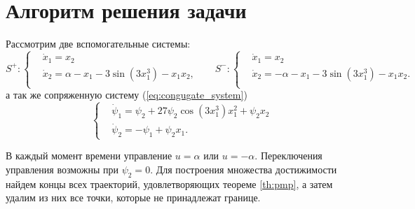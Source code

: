 \section{Алгоритм решения задачи}

Рассмотрим две вспомогательные системы:
$$
S^+ :
\left\{
\begin{aligned}
        & \dot x_1 = x_2 \\
        & \dot x_2 = \alpha - x_1 - 3 \sin(3x_1^3) - x_1 x_2, \\
\end{aligned}
\right.
\;\;\;\;\;\;
S^- :
\left\{
\begin{aligned}
        & \dot x_1 = x_2 \\
        & \dot x_2 = - \alpha - x_1 - 3 \sin(3x_1^3) - x_1 x_2. \\
\end{aligned}
\right.
$$
а так же сопряженную систему (\ref{eq:congugate_system})
$$
        \left\{
        \begin{aligned}
                & \dot\psi_1 = \psi_2 + 27\psi_2\cos(3x_1^3)x_1^2 + \psi_2 x_2 \\
                & \dot \psi_2 = -\psi_1 + \psi_2 x_1.
        \end{aligned}
        \right.
$$

В каждый момент времени управление $u = \alpha$ или $u = -\alpha$. Переключения управления возможны при $\psi_2 = 0$. Для построения множества достижимости найдем концы всех траекторий, удовлетворяющих теореме \ref{th:pmp}, а затем удалим из них все точки, которые не принадлежат границе.

